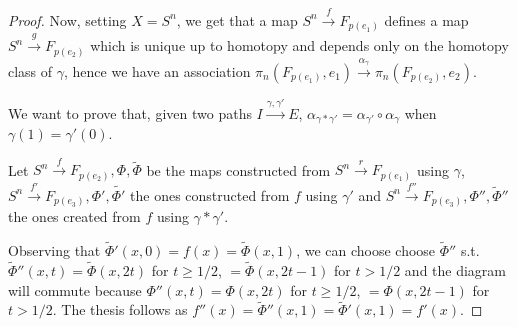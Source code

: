 \documentclass{article}
\begin{document}
\begin{proof}
    Now, setting $X=S^n$, we get that a map $S^n\xrightarrow{f}F_{p(e_1)}$
    defines a map $S^n\xrightarrow{g}F_{p(e_2)}$ which is unique up to homotopy
    and depends only on the homotopy class of $\gamma$, hence we have an
    association $\pi_n(F_{p(e_1)},e_1)\xrightarrow{\alpha_{\gamma}}
    \pi_n(F_{p(e_2)},e_2)$.

    We want to prove that, given two paths $I\xrightarrow{\gamma,\gamma'}E$,
    $\alpha_{\gamma*\gamma'}=\alpha_{\gamma'}\circ\alpha_{\gamma}$ when
    $\gamma(1)=\gamma'(0)$.

    Let $S^n\xrightarrow{f}F_{p(e_2)},\Phi,\tilde{\Phi}$ be the maps
    constructed from $S^n\xrightarrow{r}F_{p(e_1)}$ using $\gamma$,
    $S^n\xrightarrow{f'}F_{p(e_3)},\Phi',\tilde{\Phi'}$ the ones constructed
    from $f$ using $\gamma'$ and $S^n\xrightarrow{f''}F_{p(e_3)},\Phi'',
    \tilde{\Phi}''$ the ones created from $f$ using $\gamma*\gamma'$.

    Observing that $\tilde{\Phi}'(x,0)=f(x)=\tilde{\Phi}(x,1)$, we can choose
    choose $\tilde{\Phi}''$ s.t. $\tilde{\Phi}''(x,t)=\tilde{\Phi}(x,2t)$ for
    $t\geq1/2$, $=\tilde{\Phi}(x,2t-1)$ for $t>1/2$ and the diagram will commute
    because $\Phi''(x,t)=\Phi(x,2t)$ for $t\geq1/2$, $=\Phi(x,2t-1)$ for
    $t>1/2$. The thesis follows as
    $f''(x)=\tilde{\Phi}''(x,1)=\tilde{\Phi}'(x,1)=f'(x)$.
\end{proof}
\end{document}
